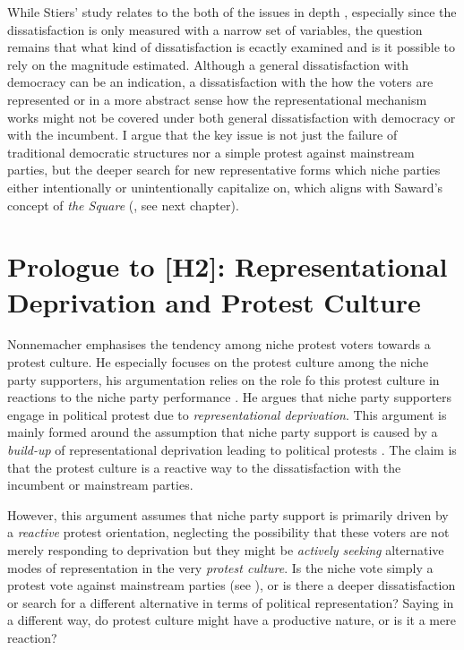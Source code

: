 While Stiers' study relates to the both of the issues in depth , especially
since the dissatisfaction is only measured with a narrow set of variables,
the question remains that what kind of dissatisfaction is ecactly examined and
is it possible to rely on the magnitude estimated. Although a general
dissatisfaction with democracy can be an indication, a dissatisfaction with the
how the voters are represented or in a more abstract sense how the
representational mechanism works might not be covered under both general
dissatisfaction with democracy or with the incumbent. I argue that the key issue is not just the failure of traditional democratic structures nor a simple protest against mainstream parties, but the deeper search for new representative forms which niche parties either intentionally or unintentionally capitalize on, which aligns with Saward’s concept of \textit{the Square} (\textcite{saward2024}, see next chapter).


\section{Prologue to [H2]: Representational Deprivation and Protest Culture}
Nonnemacher \parencite*{nonnemacher2023} emphasises the tendency among niche
protest voters towards a protest culture. He especially focuses on the protest
culture among the niche party supporters, his argumentation relies on the role
fo this protest culture in reactions to the niche party performance
\parencite[see 25-26]{nonnemacher2023}. He argues that niche party supporters engage in political protest due to \textit{representational deprivation}. This argument is mainly formed around the assumption that niche party support is caused by a \textit{build-up} of representational deprivation leading to political protests \parencite[see 30]{nonnemacher2023}. The claim is that the protest culture is a reactive way to the dissatisfaction with the incumbent or mainstream parties.

However, this argument assumes that niche party support is primarily driven by a \textit{reactive} protest orientation, neglecting the possibility that these voters are not merely responding to deprivation but they might be \textit{actively seeking} alternative modes of representation in the very \emph{protest culture}. Is the niche vote simply a protest vote against mainstream parties (see \cite{hong2015, nonnemacher2023, stiers2024}), or is there a deeper dissatisfaction or search for a different alternative in terms of political representation? Saying in a different way, do protest culture might have a productive nature, or is it a mere reaction?

